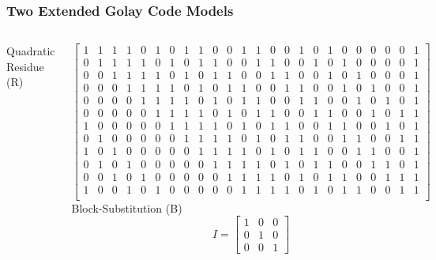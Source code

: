 \documentclass{beamer}
\begin{document}
\begin{frame}
    \frametitle{Two Extended Golay Code Models}
    \begin{columns}
        Quadratic Residue (R)
        \setcounter{MaxMatrixCols}{25}                                   
        \setlength\arraycolsep{0.5pt}                                    
        
        \scriptsize{
        \[                                                               
            \begin{bmatrix}                                          
                1&1&1&1&0&1&0&1&1&0&0&1&1&0&0&1&0&1&0&0&0&0&0&1 \\    
                0&1&1&1&1&0&1&0&1&1&0&0&1&1&0&0&1&0&1&0&0&0&0&1 \\    
                0&0&1&1&1&1&0&1&0&1&1&0&0&1&1&0&0&1&0&1&0&0&0&1 \\    
                0&0&0&1&1&1&1&0&1&0&1&1&0&0&1&1&0&0&1&0&1&0&0&1 \\    
                0&0&0&0&1&1&1&1&0&1&0&1&1&0&0&1&1&0&0&1&0&1&0&1 \\    
                0&0&0&0&0&1&1&1&1&0&1&0&1&1&0&0&1&1&0&0&1&0&1&1 \\    
                1&0&0&0&0&0&1&1&1&1&0&1&0&1&1&0&0&1&1&0&0&1&0&1 \\    
                0&1&0&0&0&0&0&1&1&1&1&0&1&0&1&1&0&0&1&1&0&0&1&1 \\    
                1&0&1&0&0&0&0&0&1&1&1&1&0&1&0&1&1&0&0&1&1&0&0&1 \\    
                0&1&0&1&0&0&0&0&0&1&1&1&1&0&1&0&1&1&0&0&1&1&0&1 \\    
                0&0&1&0&1&0&0&0&0&0&1&1&1&1&0&1&0&1&1&0&0&1&1&1 \\    
                1&0&0&1&0&1&0&0&0&0&0&1&1&1&1&0&1&0&1&1&0&0&1&1\\     
                    \end{bmatrix}                                                
        \]
        }
        Block-Substitution (B)
        \bigbreak 
        \setcounter{MaxMatrixCols}{25}                                   
        \setlength\arraycolsep{2pt}                                    
        \scriptsize{
            \[
                I = \begin{bmatrix}
                        1 & 0 & 0 \\
                        0 & 1 & 0 \\
                        0 & 0 & 1 

\end{bmatrix}\]}
\end{columns}
\end{frame}
\end{document}
